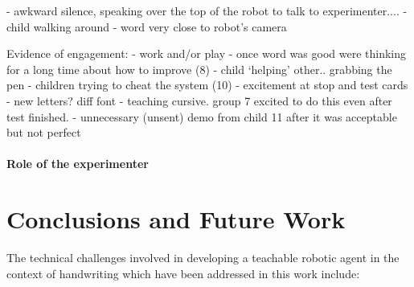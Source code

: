 \documentclass{sig-alternate}
\begin{document}
- awkward silence, speaking over the top of the robot to talk to experimenter....
- child walking around
- word very close to robot's camera

Evidence of engagement:
- work and/or play
- once word was good were thinking for a long time about how to improve (8)
- child `helping' other.. grabbing the pen
- children trying to cheat the system (10)
- excitement at stop and test cards - new letters? diff font
- teaching cursive. group 7 excited to do this even after test finished.
- unnecessary (unsent) demo from child 11 after it was acceptable but not perfect

\paragraph{Role of the experimenter}

\section{Conclusions and Future Work}


The technical challenges involved in developing a teachable robotic agent in the
context of handwriting which have been addressed in this work include:
\end{document}

